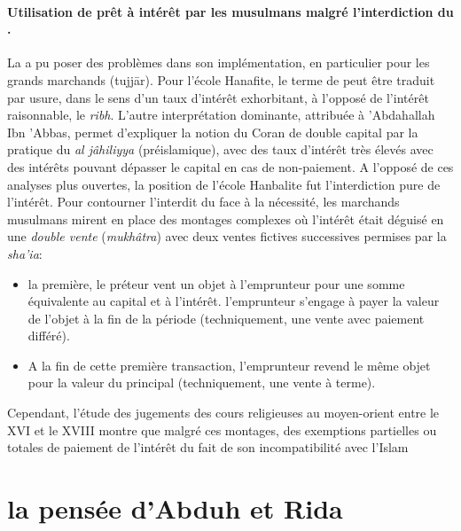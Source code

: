 \paragraph{Utilisation de prêt à intérêt par les musulmans malgré l'interdiction du \textit{\riba}.} La \textit{\riba} a pu poser des problèmes dans son implémentation, en particulier pour les grands marchands (tujjār).  
Pour l'école Hanafite, le terme de \riba peut être traduit par usure, dans le sens d'un taux d'intérêt exhorbitant, à l'opposé de l'intérêt raisonnable, le \emph{ribh}. L'autre interprétation dominante, attribuée à 'Abdahallah Ibn 'Abbas, permet d'expliquer la notion du Coran de double capital par la pratique du \textit{\riba al jâhiliyya} (préislamique), avec des taux d'intérêt très élevés avec des intérêts pouvant dépasser le capital en cas de non-paiement. A l'opposé de ces analyses plus ouvertes, la position de l'école Hanbalite fut l'interdiction pure de l'intérêt. Pour contourner l'interdit du \riba face à la nécessité, les marchands musulmans mirent en place des montages complexes où l'intérêt était déguisé en une \textit{double vente} (\emph{mukhâtra}) avec deux ventes fictives successives permises par la \textit{sha'ia}: 
\begin{itemize}
    \item la première, le préteur vent un objet à l'emprunteur pour une somme équivalente au capital et à l'intérêt. l'emprunteur s'engage à payer la valeur de l'objet à la fin de la période (techniquement, une vente avec paiement différé). 
    \item A la fin de cette première transaction, l'emprunteur revend le même objet pour la valeur du principal (techniquement, une vente à terme).
\end{itemize}
 Cependant, l'étude des jugements des cours religieuses au moyen-orient entre le XVI et le XVIII montre que malgré ces montages, des exemptions partielles ou totales de paiement de l'intérêt du fait de son incompatibilité avec l'Islam 
 

\section{la pensée d'Abduh et Rida}
